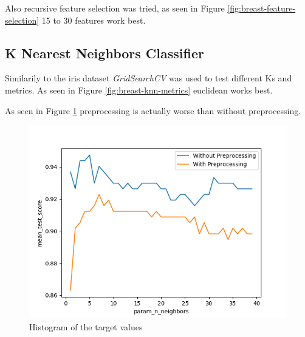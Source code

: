 
Also recursive feature selection was tried, as seen in Figure \ref{fig:breast-feature-selection} 15 to 30 features work best.


\subsection{K Nearest Neighbors Classifier}

Similarily to the iris dataset \textit{GridSearchCV} was used to test different Ks and metrics. As seen in Figure \ref{fig:breast-knn-metrics} euclidean works best. 


As seen in Figure \ref{fig:breast-knn-comparison} preprocessing is actually worse than without preprocessing.

\begin{figure}[H]
  \begin{center}
    \includegraphics[width=0.8\linewidth]{breast/plots/knn_feature_comparision.png}
    \caption{Histogram of the target values}
    \label{fig:breast-knn-comparison}
  \end{center}
\end{figure}

